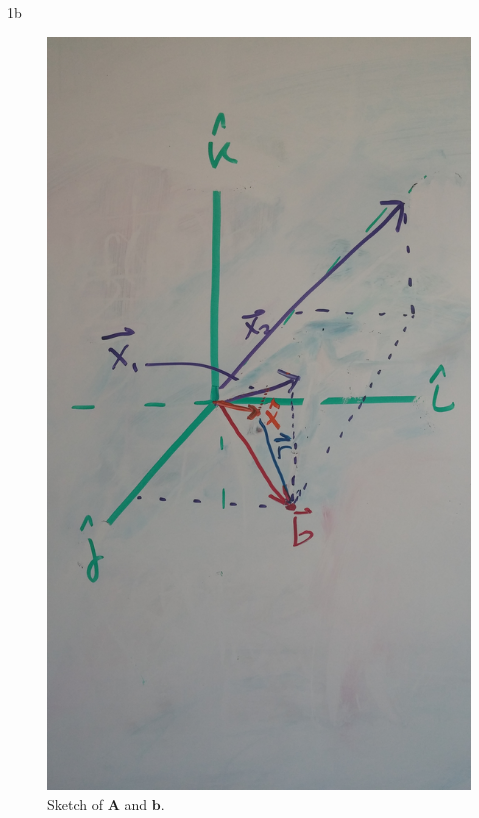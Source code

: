 \documentclass{article}
\begin{document}
\begin{homeworkProblem}
\begin{homeworkSection}{1b}
        \begin{centering}
        \begin{figure}[!ht]
            \includegraphics[scale=0.08]{problem1b_fig.jpg}

            \caption{\label{fig:1b} Sketch of $\bm{A}$ and $\bm{b}$.}

        \end{figure}
        \end{centering}

    \end{homeworkSection}

\end{homeworkProblem}
\end{document}
